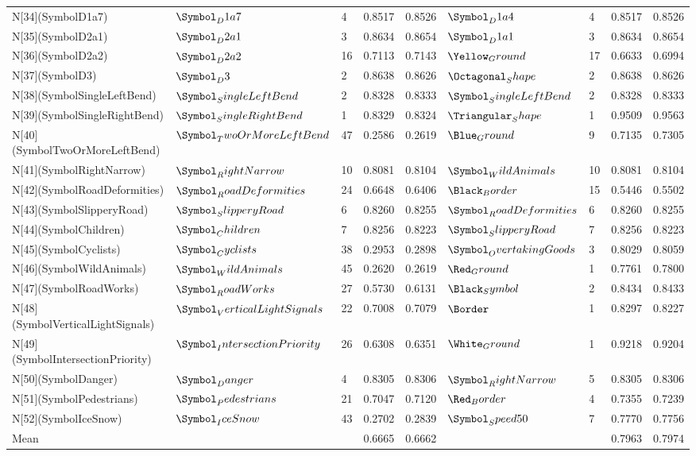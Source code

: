 \begin{tabular}{lllllllll}
N[34](SymbolD1a7) & $\Symbol_D1a7$ & 4 & 0.8517 & 0.8526 & $\Symbol_D1a4$ & 4 & 0.8517 & 0.8526 \\
N[35](SymbolD2a1) & $\Symbol_D2a1$ & 3 & 0.8634 & 0.8654 & $\Symbol_D1a1$ & 3 & 0.8634 & 0.8654 \\
N[36](SymbolD2a2) & $\Symbol_D2a2$ & 16 & 0.7113 & 0.7143 & $\Yellow_Ground$ & 17 & 0.6633 & 0.6994 \\
N[37](SymbolD3) & $\Symbol_D3$ & 2 & 0.8638 & 0.8626 & $\Octagonal_Shape$ & 2 & 0.8638 & 0.8626 \\
N[38](SymbolSingleLeftBend) & $\Symbol_SingleLeftBend$ & 2 & 0.8328 & 0.8333 & $\Symbol_SingleLeftBend$ & 2 & 0.8328 & 0.8333 \\
N[39](SymbolSingleRightBend) & $\Symbol_SingleRightBend$ & 1 & 0.8329 & 0.8324 & $\Triangular_Shape$ & 1 & 0.9509 & 0.9563 \\
N[40](SymbolTwoOrMoreLeftBend) & $\Symbol_TwoOrMoreLeftBend$ & 47 & 0.2586 & 0.2619 & $\Blue_Ground$ & 9 & 0.7135 & 0.7305 \\
N[41](SymbolRightNarrow) & $\Symbol_RightNarrow$ & 10 & 0.8081 & 0.8104 & $\Symbol_WildAnimals$ & 10 & 0.8081 & 0.8104 \\
N[42](SymbolRoadDeformities) & $\Symbol_RoadDeformities$ & 24 & 0.6648 & 0.6406 & $\Black_Border$ & 15 & 0.5446 & 0.5502 \\
N[43](SymbolSlipperyRoad) & $\Symbol_SlipperyRoad$ & 6 & 0.8260 & 0.8255 & $\Symbol_RoadDeformities$ & 6 & 0.8260 & 0.8255 \\
N[44](SymbolChildren) & $\Symbol_Children$ & 7 & 0.8256 & 0.8223 & $\Symbol_SlipperyRoad$ & 7 & 0.8256 & 0.8223 \\
N[45](SymbolCyclists) & $\Symbol_Cyclists$ & 38 & 0.2953 & 0.2898 & $\Symbol_OvertakingGoods$ & 3 & 0.8029 & 0.8059 \\
N[46](SymbolWildAnimals) & $\Symbol_WildAnimals$ & 45 & 0.2620 & 0.2619 & $\Red_Ground$ & 1 & 0.7761 & 0.7800 \\
N[47](SymbolRoadWorks) & $\Symbol_RoadWorks$ & 27 & 0.5730 & 0.6131 & $\Black_Symbol$ & 2 & 0.8434 & 0.8433 \\
N[48](SymbolVerticalLightSignals) & $\Symbol_VerticalLightSignals$ & 22 & 0.7008 & 0.7079 & $\Border$ & 1 & 0.8297 & 0.8227 \\
N[49](SymbolIntersectionPriority) & $\Symbol_IntersectionPriority$ & 26 & 0.6308 & 0.6351 & $\White_Ground$ & 1 & 0.9218 & 0.9204 \\
N[50](SymbolDanger) & $\Symbol_Danger$ & 4 & 0.8305 & 0.8306 & $\Symbol_RightNarrow$ & 5 & 0.8305 & 0.8306 \\
N[51](SymbolPedestrians) & $\Symbol_Pedestrians$ & 21 & 0.7047 & 0.7120 & $\Red_Border$ & 4 & 0.7355 & 0.7239 \\
N[52](SymbolIceSnow) & $\Symbol_IceSnow$ & 43 & 0.2702 & 0.2839 & $\Symbol_Speed50$ & 7 & 0.7770 & 0.7756 \\
Mean &  &  & 0.6665 & 0.6662 &  &  & 0.7963 & 0.7974 \\
\bottomrule
\end{tabular}
